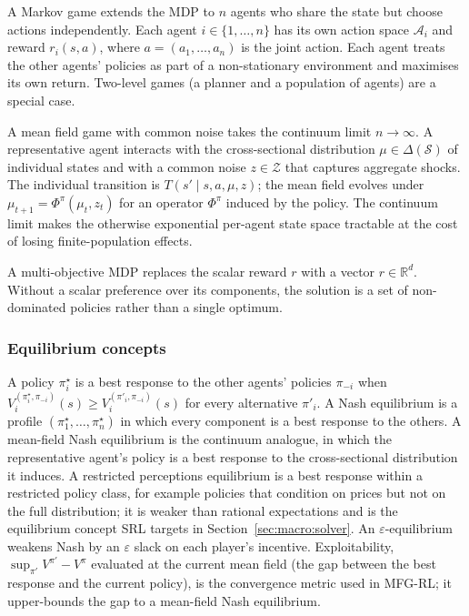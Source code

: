 A Markov game extends the MDP to $n$ agents who share the state but
choose actions independently. Each agent $i \in \{1, \ldots, n\}$ has
its own action space $\mathcal A_i$ and reward $r_i(s, a)$, where
$a = (a_1, \ldots, a_n)$ is the joint action. Each agent treats the
other agents' policies as part of a non-stationary environment and
maximises its own return. Two-level games (a planner and a population
of agents) are a special case.

A mean field game with common noise takes the continuum limit
$n \to \infty$. A representative agent interacts with the
cross-sectional distribution $\mu \in \Delta(\mathcal S)$ of
individual states and with a common noise $z \in \mathcal Z$ that
captures aggregate shocks. The individual transition is
$T(s' \mid s, a, \mu, z)$; the mean field evolves under
$\mu_{t+1} = \Phi^\pi(\mu_t, z_t)$ for an operator $\Phi^\pi$ induced
by the policy. The continuum limit makes the otherwise exponential
per-agent state space tractable at the cost of losing finite-population
effects.

A multi-objective MDP replaces the scalar reward $r$ with a vector
$r \in \mathbb R^d$. Without a scalar preference over its components,
the solution is a set of non-dominated policies rather than a single
optimum.

\subsubsection{Equilibrium concepts}

A policy $\pi^\star_i$ is a best response to the other agents'
policies $\pi_{-i}$ when $V_i^{(\pi^\star_i, \pi_{-i})}(s) \ge
V_i^{(\pi'_i, \pi_{-i})}(s)$ for every alternative $\pi'_i$. A Nash
equilibrium is a profile $(\pi^\star_1, \ldots, \pi^\star_n)$ in which
every component is a best response to the others. A mean-field Nash
equilibrium is the continuum analogue, in which the representative
agent's policy is a best response to the cross-sectional distribution
it induces. A restricted perceptions equilibrium is a best response
within a restricted policy class, for example policies that condition
on prices but not on the full distribution; it is weaker than
rational expectations and is the equilibrium concept SRL targets in
Section~\ref{sec:macro:solver}. An
$\varepsilon$-equilibrium weakens Nash by an $\varepsilon$ slack on
each player's incentive. Exploitability, $\sup_{\pi'} V^{\pi'} -
V^\pi$ evaluated at the current mean field (the gap between the best
response and the current policy), is the convergence metric used in
MFG-RL; it upper-bounds the gap to a mean-field Nash equilibrium.

